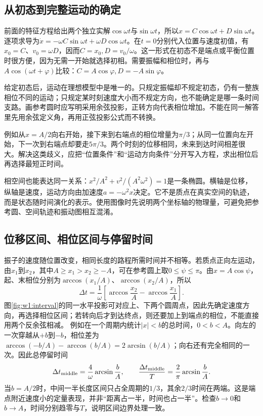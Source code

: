 \subsection{从初态到完整运动的确定}
前面的特征方程给出两个独立实解$\cos\omega t$与$\sin\omega t$，所以$x=C\cos\omega t+D\sin\omega t$。逐项求导为$\dot x=-\omega C\sin\omega t+\omega D\cos\omega t$。在$t=0$分别代入位置与速度初值，有$x_0=C$、$v_0=\omega D$，因而$C=x_0,D=v_0/\omega$。这一形式在初态不是端点或平衡位置时很方便，因为无需一开始就选择初相。需要振幅和相位时，再与$A\cos(\omega t+\varphi)$比较：$C=A\cos\varphi,D=-A\sin\varphi$。

给定初态后，运动在理想模型中是唯一的。只规定振幅却不规定初态，仍有一整族相位不同的运动；只规定某时刻速度大小而不规定方向，也不能确定是哪一条时间支路。画参考圆时应写明采用余弦投影，正转方向代表相位增加。不能在同一解答里先用余弦定义角，再用正弦投影公式而不转换。

例如从$x=A/2$向右开始，接下来到右端点的相位增量为$\pi/3$；从同一位置向左开始，下一次到右端点却要走$5\pi/3$。两个时刻的位移相同，未来到达时间相差很大。解决这类歧义，应把“位置条件”和“运动方向条件”分开写入方程，求出相位后再选择最短正时间。

相空间也能表达同一关系：$x^2/A^2+v^2/(A^2\omega^2)=1$是一条椭圆。横轴是位移，纵轴是速度，运动方向由加速度$a=-\omega^2x$决定。它不是质点在真实空间的轨迹，而是状态随时间演化的表示。使用图像时先说明两个坐标轴的物理量，可避免把参考圆、空间轨迹和振动图相互混淆。



\subsection{位移区间、相位区间与停留时间}
振子的速度随位置改变，相同长度的路程所需时间并不相等。若质点正向左运动，由$x_1$到$x_2$，其中$A\ge x_1>x_2\ge-A$，可在参考圆上取$0\le\psi\le\pi$。由$x=A\cos\psi$，起、末相位分别为$\arccos(x_1/A)$、$\arccos(x_2/A)$，所以
\[
\Delta t=\frac1\omega\left[\arccos\frac{x_2}{A}-\arccos\frac{x_1}{A}\right].
\]
图\ref{fig:w1:interval}的同一水平投影可对应上、下两个圆周点，因此先确定速度方向，再选择相位区间；若转向后才到达终点，则还要加上到端点的相位，不能直接用两个反余弦相减。
例如在一个周期内统计$|x|<b$的总时间，$0<b<A$。向左的一次穿越从$+b$到$-b$，相位差为$\arccos(-b/A)-\arccos(b/A)=2\arcsin(b/A)$；向右还有完全相同的一次。因此总停留时间
\[
\Delta t_{\rm middle}=\frac4\omega\arcsin\frac bA,\qquad
\frac{\Delta t_{\rm middle}}T=\frac2\pi\arcsin\frac bA.
\]
当$b=A/2$时，中间一半长度区间只占全周期的$1/3$，其余$2/3$时间在两端。这是端点附近速度小的定量表现，并非“距离占一半，时间也占一半”。检查$b\to0$和$b\to A$，时间分别趋零与$T$，说明区间边界处理一致。

